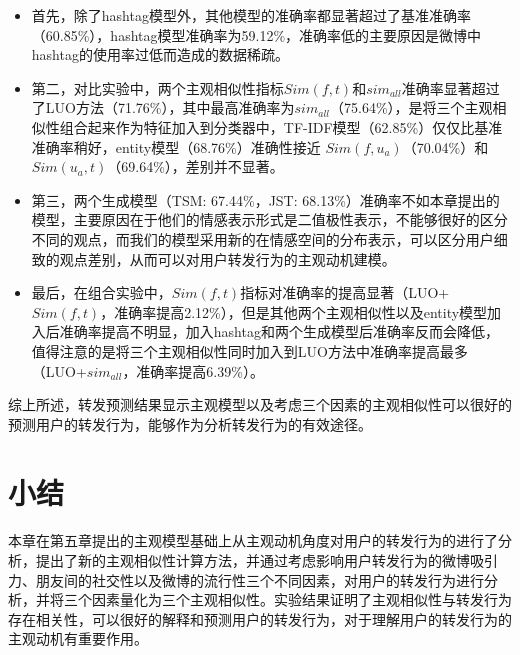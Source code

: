 \begin{itemize}
\item 首先，除了hashtag模型外，其他模型的准确率都显著超过了基准准确率（60.85\%），hashtag模型准确率为59.12\%，准确率低的主要原因是微博中hashtag的使用率过低而造成的数据稀疏。
\item 第二，对比实验中，两个主观相似性指标$ Sim(f,t) $和$ sim_{all}  $准确率显著超过了LUO方法（71.76\%），其中最高准确率为$ sim_{all}  $（75.64\%），是将三个主观相似性组合起来作为特征加入到分类器中，TF-IDF模型（62.85\%）仅仅比基准准确率稍好，entity模型（68.76\%）准确性接近 $ Sim(f,u_a)$（70.04\%）和$ Sim(u_a,t)  $（69.64\%），差别并不显著。
\item 第三，两个生成模型（TSM: 67.44\%，JST: 68.13\%）准确率不如本章提出的模型，主要原因在于他们的情感表示形式是二值极性表示，不能够很好的区分不同的观点，而我们的模型采用新的在情感空间的分布表示，可以区分用户细致的观点差别，从而可以对用户转发行为的主观动机建模。
\item 最后，在组合实验中，$ Sim(f,t) $指标对准确率的提高显著（LUO+$ Sim(f,t) $，准确率提高2.12\%），但是其他两个主观相似性以及entity模型加入后准确率提高不明显，加入hashtag和两个生成模型后准确率反而会降低，值得注意的是将三个主观相似性同时加入到LUO方法中准确率提高最多（LUO+$ sim_{all}  $，准确率提高6.39\%）。
\end{itemize}

综上所述，转发预测结果显示主观模型以及考虑三个因素的主观相似性可以很好的预测用户的转发行为，能够作为分析转发行为的有效途径。

\section{小结}
本章在第五章提出的主观模型基础上从主观动机角度对用户的转发行为的进行了分析，提出了新的主观相似性计算方法，并通过考虑影响用户转发行为的微博吸引力、朋友间的社交性以及微博的流行性三个不同因素，对用户的转发行为进行分析，并将三个因素量化为三个主观相似性。实验结果证明了主观相似性与转发行为存在相关性，可以很好的解释和预测用户的转发行为，对于理解用户的转发行为的主观动机有重要作用。

\newpage 
\mbox{} 
\newpage